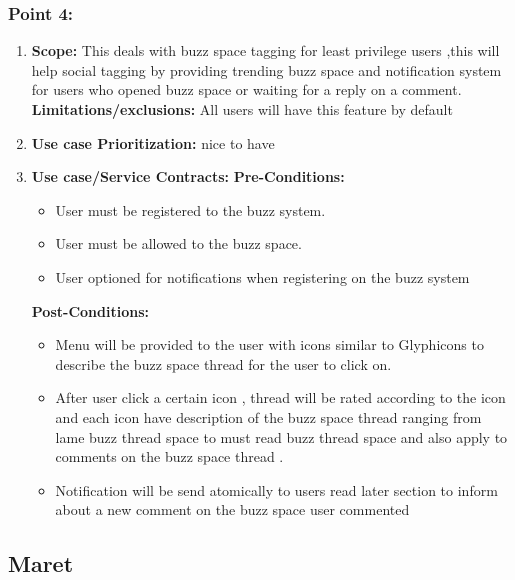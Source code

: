 \documentclass[11pt]{article}
\begin{document}
\subsubsection{Point 4:} 
\begin{enumerate}
\item 
\textbf{Scope:}
This deals with buzz space tagging for least privilege users ,this will help social tagging by providing trending buzz space and notification system for users who opened buzz space or waiting for a reply on a comment.
\newline
\textbf{Limitations/exclusions:} 
All users will have this feature by default
\item 
\textbf{Use case Prioritization:} nice to have

\item 
\textbf{Use case/Service Contracts:} 
\newline
\textbf{Pre-Conditions: }
\begin{itemize}
\item User must be registered to the buzz system.
\item User must be allowed to the buzz space.
\item User optioned for notifications when registering on the buzz system

\end{itemize}
 

\textbf{Post-Conditions: }
\begin{itemize}
\item Menu will be provided to the user with icons similar to Glyphicons to describe the buzz space thread for the user to click on.
\item After user click a certain icon , thread will be rated according to the icon and each icon have description of the buzz space thread ranging from lame buzz thread space to must read buzz thread space and also apply to comments on the buzz space thread .
\item Notification will be send atomically to users read later section to inform about a new comment on the buzz space user commented 
\end{itemize}
\end{enumerate}



\newpage

\subsection{Maret}
\end{document}
